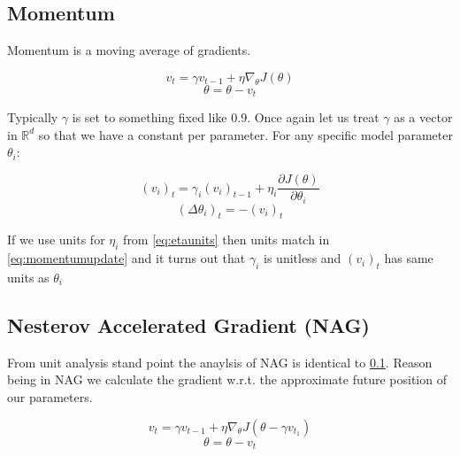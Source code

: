 \documentclass{article}
\begin{document}
\subsection{Momentum} \label{momentum}
	Momentum \cite{qian1999momentum} is a moving average of gradients. 
	
	\begin{center} 
		\begin{equation} v_{t} = \gamma v_{t-1} +  \eta \nabla_{\theta} J(\theta)  \end{equation} 
		\begin{equation} \theta = \theta - v_t \end{equation} 
	\end{center}
	
	Typically $\gamma$ is set to something fixed like 0.9. Once again let us treat $\gamma$ as a vector in $\mathbb{R}^{d}$ so that we have a constant per parameter. For any specific model parameter $\theta_{i}$:
	
	\begin{center} 
		\begin{equation} (v_{i})_{t} = \gamma_{i} (v_{i})_{t-1} +  \eta_{i} \frac {\partial J(\theta)} {\partial \theta_{i}}  \label{eq:momentumupdate} \end{equation} 
		\begin{equation}(\Delta \theta_{i})_{t} = - (v_{i})_{t}  \end{equation}
	\end{center}
	
	If we use units for $\eta_{i}$ from \ref{eq:etaunits} then units match in \ref{eq:momentumupdate} and it turns out that $\gamma_{i}$ is unitless and $(v_{i})_{t}$ has same units as $\theta_{i}$
	
\subsection{Nesterov Accelerated Gradient (NAG)}
	From unit analysis stand point the anaylsis of NAG \cite{10029946121} is identical to \ref{momentum}. Reason being in NAG we calculate the gradient w.r.t. the approximate future position of our parameters.
	
	\begin{center} 
		\begin{equation} v_{t} = \gamma v_{t-1} +  \eta \nabla_{\theta} J(\theta-\gamma v_{t_1})  \end{equation} 
		\begin{equation} \theta = \theta - v_t \end{equation} 
	\end{center}
\end{document}
